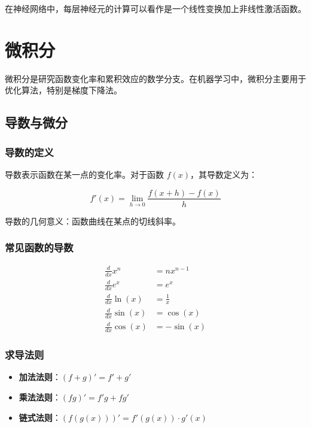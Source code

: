 \documentclass[12pt,UTF8]{ctexbook}
\begin{document}
在神经网络中，每层神经元的计算可以看作是一个线性变换加上非线性激活函数。

\section{微积分}
\label{sec:calculus}

微积分是研究函数变化率和累积效应的数学分支。在机器学习中，微积分主要用于优化算法，特别是梯度下降法。

\subsection{导数与微分}

\subsubsection{导数的定义}

导数表示函数在某一点的变化率。对于函数 $f(x)$，其导数定义为：

$$f'(x) = \lim_{h \to 0} \frac{f(x+h) - f(x)}{h}$$

导数的几何意义：函数曲线在某点的切线斜率。

\subsubsection{常见函数的导数}

\begin{align*}
\frac{d}{dx} x^n &= nx^{n-1} \\
\frac{d}{dx} e^x &= e^x \\
\frac{d}{dx} \ln(x) &= \frac{1}{x} \\
\frac{d}{dx} \sin(x) &= \cos(x) \\
\frac{d}{dx} \cos(x) &= -\sin(x)
\end{align*}

\subsubsection{求导法则}

\begin{itemize}[leftmargin=2cm]
    \item \textbf{加法法则}：$(f + g)' = f' + g'$
    \item \textbf{乘法法则}：$(fg)' = f'g + fg'$
    \item \textbf{链式法则}：$(f(g(x)))' = f'(g(x)) \cdot g'(x)$
\end{itemize}
\end{document}
